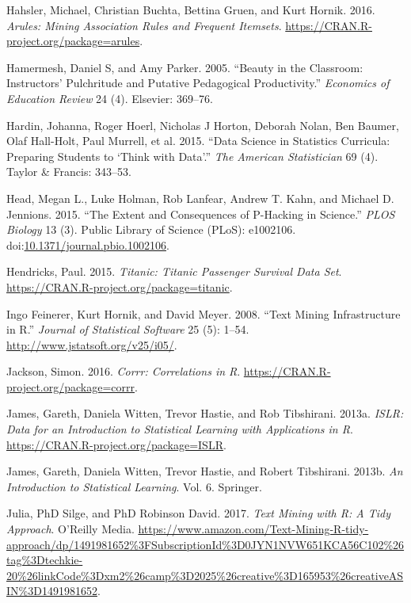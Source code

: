 \documentclass[12pt,]{book}
\begin{document}
\hypertarget{ref-R-arules}{}
Hahsler, Michael, Christian Buchta, Bettina Gruen, and Kurt Hornik.
2016. \emph{Arules: Mining Association Rules and Frequent Itemsets}.
\url{https://CRAN.R-project.org/package=arules}.

\hypertarget{ref-hamermesh2005beauty}{}
Hamermesh, Daniel S, and Amy Parker. 2005. ``Beauty in the Classroom:
Instructors' Pulchritude and Putative Pedagogical Productivity.''
\emph{Economics of Education Review} 24 (4). Elsevier: 369--76.

\hypertarget{ref-hardin2015data}{}
Hardin, Johanna, Roger Hoerl, Nicholas J Horton, Deborah Nolan, Ben
Baumer, Olaf Hall-Holt, Paul Murrell, et al. 2015. ``Data Science in
Statistics Curricula: Preparing Students to `Think with Data'.''
\emph{The American Statistician} 69 (4). Taylor \& Francis: 343--53.

\hypertarget{ref-Head2015}{}
Head, Megan L., Luke Holman, Rob Lanfear, Andrew T. Kahn, and Michael D.
Jennions. 2015. ``The Extent and Consequences of P-Hacking in Science.''
\emph{PLOS Biology} 13 (3). Public Library of Science (PLoS): e1002106.
doi:\href{https://doi.org/10.1371/journal.pbio.1002106}{10.1371/journal.pbio.1002106}.

\hypertarget{ref-R-titanic}{}
Hendricks, Paul. 2015. \emph{Titanic: Titanic Passenger Survival Data
Set}. \url{https://CRAN.R-project.org/package=titanic}.

\hypertarget{ref-tm}{}
Ingo Feinerer, Kurt Hornik, and David Meyer. 2008. ``Text Mining
Infrastructure in R.'' \emph{Journal of Statistical Software} 25 (5):
1--54. \url{http://www.jstatsoft.org/v25/i05/}.

\hypertarget{ref-R-corrr}{}
Jackson, Simon. 2016. \emph{Corrr: Correlations in R}.
\url{https://CRAN.R-project.org/package=corrr}.

\hypertarget{ref-R-ISLR}{}
James, Gareth, Daniela Witten, Trevor Hastie, and Rob Tibshirani. 2013a.
\emph{ISLR: Data for an Introduction to Statistical Learning with
Applications in R}. \url{https://CRAN.R-project.org/package=ISLR}.

\hypertarget{ref-introstatlearning}{}
James, Gareth, Daniela Witten, Trevor Hastie, and Robert Tibshirani.
2013b. \emph{An Introduction to Statistical Learning}. Vol. 6. Springer.

\hypertarget{ref-tidytextminig}{}
Julia, PhD Silge, and PhD Robinson David. 2017. \emph{Text Mining with
R: A Tidy Approach}. O'Reilly Media.
\url{https://www.amazon.com/Text-Mining-R-tidy-approach/dp/1491981652\%3FSubscriptionId\%3D0JYN1NVW651KCA56C102\%26tag\%3Dtechkie-20\%26linkCode\%3Dxm2\%26camp\%3D2025\%26creative\%3D165953\%26creativeASIN\%3D1491981652}.
\end{document}
